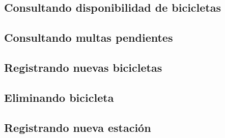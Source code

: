 \documentclass[a4paper, 10pt, twoside]{article}
\begin{document}
\subsection{Consultando disponibilidad de bicicletas}
\begin{usecase}
  \ucpre{}
  \ucpost{}
  \ucname{}
  \ucactor{}
\end{usecase}
\begin{usecasesteps}
  \ucstep{}{}
  \ucstep{}{}
  \ucstep{}{}
\end{usecasesteps}

\subsection{Consultando multas pendientes}
\begin{usecase}
  \ucpre{}
  \ucpost{}
  \ucname{}
  \ucactor{}
\end{usecase}
\begin{usecasesteps}
  \ucstep{}{}
  \ucstep{}{}
  \ucstep{}{}
\end{usecasesteps}

\subsection{Registrando nuevas bicicletas}
\begin{usecase}
  \ucpre{}
  \ucpost{}
  \ucname{}
  \ucactor{}
\end{usecase}
\begin{usecasesteps}
  \ucstep{}{}
  \ucstep{}{}
  \ucstep{}{}
\end{usecasesteps}

\subsection{Eliminando bicicleta}
\begin{usecase}
  \ucpre{}
  \ucpost{}
  \ucname{}
  \ucactor{}
\end{usecase}
\begin{usecasesteps}
  \ucstep{}{}
  \ucstep{}{}
  \ucstep{}{}
\end{usecasesteps}

\subsection{Registrando nueva estación}
\begin{usecase}
  \ucpre{}
  \ucpost{}
  \ucname{}
  \ucactor{}
\end{usecase}
\begin{usecasesteps}
  \ucstep{}{}
  \ucstep{}{}
  \ucstep{}{}
\end{usecasesteps}
\end{document}

